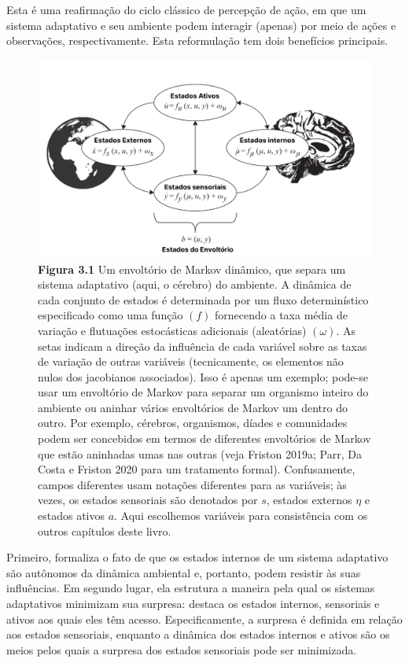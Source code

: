 \documentclass[
  12pt,
]{book}
\begin{document}
Esta é uma reafirmação do ciclo clássico de percepção de ação, em que um sistema adaptativo e seu ambiente podem interagir (apenas) por meio de ações e observações, respectivamente. Esta reformulação tem dois benefícios principais.

\begin{figure}
\centering
\includegraphics{images/Figura_3_1.png}
\caption{\textbf{Figura 3.1} Um envoltório de Markov dinâmico, que separa um sistema adaptativo (aqui, o cérebro) do ambiente. A dinâmica de cada conjunto de estados é determinada por um fluxo determinístico especificado como uma função \((f)\) fornecendo a taxa média de variação e flutuações estocásticas adicionais (aleatórias) \((ω)\). As setas indicam a direção da influência de cada variável sobre as taxas de variação de outras variáveis (tecnicamente, os elementos não nulos dos jacobianos associados). Isso é apenas um exemplo; pode-se usar um envoltório de Markov para separar um organismo inteiro do ambiente ou aninhar vários envoltórios de Markov um dentro do outro. Por exemplo, cérebros, organismos, díades e comunidades podem ser concebidos em termos de diferentes envoltórios de Markov que estão aninhadas umas nas outras (veja Friston 2019a; Parr, Da Costa e Friston 2020 para um tratamento formal). Confusamente, campos diferentes usam notações diferentes para as variáveis; às vezes, os estados sensoriais são denotados por \(s\), estados externos \(η\) e estados ativos \(a\). Aqui escolhemos variáveis para consistência com os outros capítulos deste livro.}
\end{figure}

Primeiro, formaliza o fato de que os estados internos de um sistema adaptativo são autônomos da dinâmica ambiental e, portanto, podem resistir às suas influências. Em segundo lugar, ela estrutura a maneira pela qual os sistemas adaptativos minimizam sua surpresa: destaca os estados internos, sensoriais e ativos aos quais eles têm acesso. Especificamente, a surpresa é definida em relação aos estados sensoriais, enquanto a dinâmica dos estados internos e ativos são os meios pelos quais a surpresa dos estados sensoriais pode ser minimizada.
\end{document}
